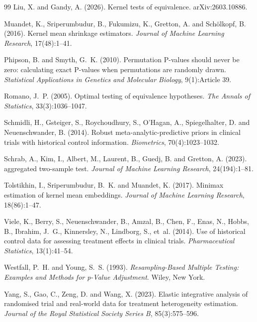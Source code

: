 \begin{thebibliography}{99}
Liu, X. and Gandy, A. (2026).
\newblock Kernel tests of equivalence.
\newblock arXiv:2603.10886.

Muandet, K., Sriperumbudur, B., Fukumizu, K., Gretton, A. and Sch\"olkopf, B. (2016).
\newblock Kernel mean shrinkage estimators.
\newblock \emph{Journal of Machine Learning Research}, 17(48):1--41.

Phipson, B. and Smyth, G.~K. (2010).
\newblock Permutation {P}-values should never be zero: calculating exact {P}-values when permutations are randomly drawn.
\newblock \emph{Statistical Applications in Genetics and Molecular Biology}, 9(1):Article 39.

Romano, J.~P. (2005).
\newblock Optimal testing of equivalence hypotheses.
\newblock \emph{The Annals of Statistics}, 33(3):1036--1047.

Schmidli, H., Gsteiger, S., Roychoudhury, S., O'Hagan, A., Spiegelhalter, D. and Neuenschwander, B. (2014).
\newblock Robust meta-analytic-predictive priors in clinical trials with historical control information.
\newblock \emph{Biometrics}, 70(4):1023--1032.

Schrab, A., Kim, I., Albert, M., Laurent, B., Guedj, B. and Gretton, A. (2023).
 aggregated two-sample test.
\newblock \emph{Journal of Machine Learning Research}, 24(194):1--81.

Tolstikhin, I., Sriperumbudur, B.~K. and Muandet, K. (2017).
\newblock Minimax estimation of kernel mean embeddings.
\newblock \emph{Journal of Machine Learning Research}, 18(86):1--47.

Viele, K., Berry, S., Neuenschwander, B., Amzal, B., Chen, F., Enas, N., Hobbs, B., Ibrahim, J.~G., Kinnersley, N., Lindborg, S., et~al. (2014).
\newblock Use of historical control data for assessing treatment effects in clinical trials.
\newblock \emph{Pharmaceutical Statistics}, 13(1):41--54.

Westfall, P.~H. and Young, S.~S. (1993).
\newblock \emph{Resampling-Based Multiple Testing: Examples and Methods for p-Value Adjustment}.
\newblock Wiley, New York.

Yang, S., Gao, C., Zeng, D. and Wang, X. (2023).
\newblock Elastic integrative analysis of randomised trial and real-world data for treatment heterogeneity estimation.
\newblock \emph{Journal of the Royal Statistical Society Series B}, 85(3):575--596.


\end{thebibliography}
